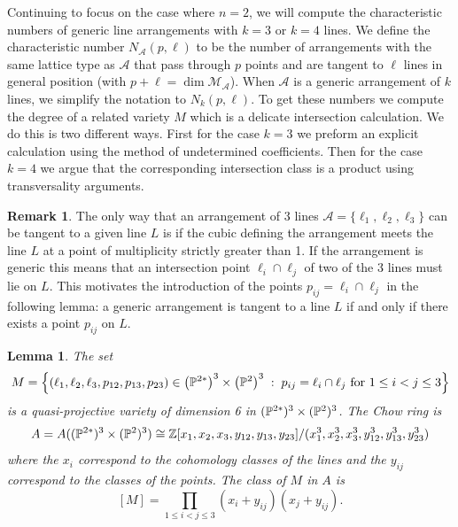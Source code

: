 \documentclass[12pt]{article}
\theoremstyle{plain}
\newtheorem{lemma}[theorem]{Lemma}
\theoremstyle{definition}
\newtheorem{remark}[theorem]{Remark}
\newcommand{\A}{\mathcal{A}}
\newcommand{\M}{\mathcal{M}}
\newcommand{\Z}{\mathbb{Z}}
\renewcommand{\P}{\ensuremath \mathbb{P}}
\begin{document}
Continuing to focus on the case where $n=2$, we will compute the
characteristic numbers of generic line arrangements with $k=3$ or
$k=4$ lines.  We define the characteristic number $N_\A(p,\ell)$ to be the number of arrangements with the same lattice type as $\A$ that
pass through $p$ points and are tangent to $\ell$ lines in general
position (with $p + \ell = \dim \M_\A$). When $\A$ is a generic arrangement of $k$ lines, we simplify the notation to $N_k(p,\ell)$. To get these numbers we compute the degree of a related variety $M$ which is a delicate intersection calculation. We do this is two different ways. First for the case $k=3$ we preform an explicit calculation using the method of undetermined coefficients. Then for the case $k=4$ we argue that the corresponding intersection class is a product using transversality arguments.

\begin{remark} \label{tangencyremark} The only way that an arrangement of 3 lines $\A=\{\ell_1,\ell_2,\ell_3\}$ can be tangent to a given line $L$ is if the cubic defining the arrangement meets the line $L$ at a point of multiplicity strictly greater than 1. If the arrangement is generic this means that an intersection point $\ell_i\cap \ell_j$ of two of the 3 lines must lie on $L$. This motivates the introduction of the points $p_{ij}=\ell_i\cap \ell_j$ in the following lemma: a generic arrangement is tangent to a line $L$ if and only if there exists a point $p_{ij}$ on $L$. \end{remark}

\begin{lemma}\label{3linesM}
The set
$$ M = \left\{(\ell_1,\ell_2,\ell_3,p_{12},p_{13},p_{23}) \in 
\left( \P^{2*}\right)^3 \times \left( \P^2 \right)^3\; : \; p_{ij} =
\ell_i \cap \ell_j  \text{ for $1 \leq i < j \leq 3$} \right\}$$ 
is a quasi-projective variety of dimension 6 in $(\P^{2*})^3\times (\P^{2})^3$. The Chow ring is $$A=A((\P^{2*})^3\times (\P^{2})^3)\cong \Z[x_1,x_2,x_3,y_{12},y_{13},y_{23}]/(x_1^3,x_2^3,x_3^3,y_{12}^3,y_{13}^3,y_{23}^3)$$ where the $x_i$ correspond to the cohomology classes of the lines and the $y_{ij}$ correspond to the classes of the points. The class of $M$ in $A$ is $$[M]=
\prod_{1 \leq i < j \leq 3} (x_i + y_{ij})(x_j + y_{ij}) .$$

\end{lemma}
\end{document}
